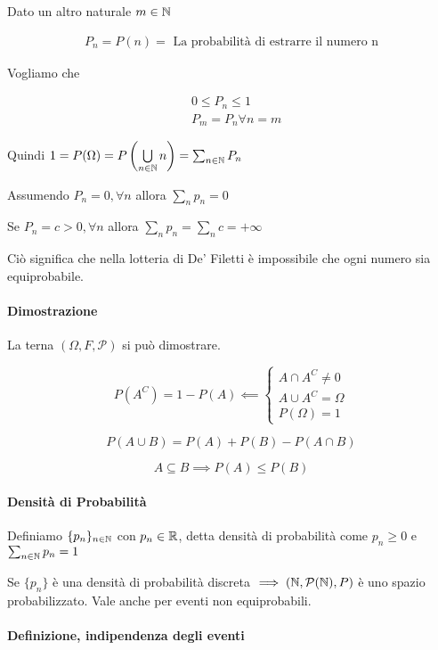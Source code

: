 Dato un altro naturale $ m \in \mathbb{N} $

\begin{align*}
P_n = P(n) = \text{ La probabilità di estrarre il numero n}
\end{align*}

Vogliamo che 

\begin{align*}
& 0 \leq P_n \leq 1 \\
& P_m = P_n \forall n = m
\end{align*}

Quindi $ 1 = P(\Omega) = P \left( \bigcup\limits_{n \in \mathbb{N}} n \right) = \sum_{n \in \mathbb{N}} P_n $

Assumendo $ P_n = 0, \forall n $ allora $ \sum_{n} p_n = 0 $

Se $ P_n = c > 0, \forall n $ allora $ \sum_{n} p_n = \sum_{n} c = + \infty $

Ciò significa che nella lotteria di De' Filetti è impossibile che ogni numero sia equiprobabile.

\paragraph{Dimostrazione}

La terna $ (\Omega, F, \mathcal{P}) $ si può dimostrare.

\[ P(A^C) = 1 - P(A) \impliedby \begin{cases}
A \cap A^C \neq 0 \\
A \cup A^C = \Omega \\
P(\Omega) = 1
\end{cases} \]

\[ P(A \cup B) = P(A) + P(B) - P(A \cap B)\]

\[ A \subseteq B \implies P(A) \leq P(B) \]

\paragraph{Densità di Probabilità}

Definiamo $ \{p_n\}_{n \in \mathbb{N}} $ con $ p_n \in \mathbb{R} $, detta densità di probabilità come $ p_n \geq 0 $ e $ \sum_{n \in \mathbb{N}} p_n = 1 $ 

Se $ \{p_n\} $ è una densità di probabilità discreta $ \implies \left( \mathbb{N}, \mathcal{P}(\mathbb{N}), P\right) $ è uno spazio probabilizzato. Vale anche per eventi non equiprobabili.

\paragraph{Definizione, indipendenza degli eventi} 

